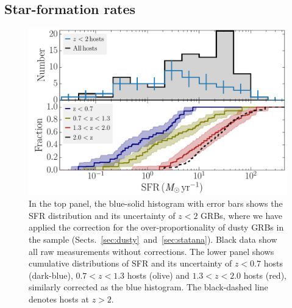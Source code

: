 \documentclass[traditabstract, longauth]{aa}
\begin{document}
\subsection{Star-formation rates}
\label{sec:sfr}

\begin{figure}
\includegraphics[angle=0, width=0.99\columnwidth]{Figs/SFR_histogram.pdf}
\caption{In the top panel, the blue-solid histogram with error bars shows the SFR distribution and its uncertainty of $z < 2$ GRBs, where we have applied the correction for the over-proportionality of dusty GRBs in the sample (Sects.~\ref{sec:dusty}~and~\ref{sec:statana}). Black data show all raw measurements without corrections. The lower panel shows cumulative distributions of SFR and its uncertainty of $z<0.7$ hosts (dark-blue), $0.7<z<1.3$ hosts (olive) and $1.3<z<2.0$ hosts (red), similarly corrected as the blue histogram. The black-dashed line denotes hosts at $z > 2$.}
\label{fig:sfrhist}
\end{figure}
\end{document}
